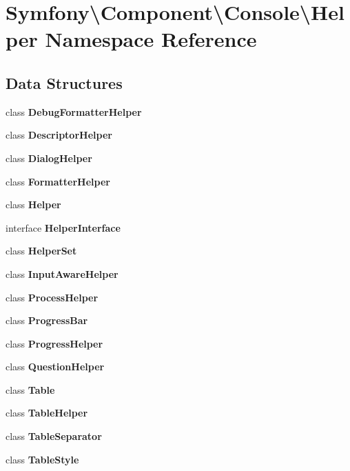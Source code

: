 \section{Symfony\textbackslash{}Component\textbackslash{}Console\textbackslash{}Helper Namespace Reference}
\label{namespace_symfony_1_1_component_1_1_console_1_1_helper}
\subsection*{Data Structures}
\begin{DoxyCompactItemize}
\item 
class {\bf Debug\+Formatter\+Helper}
\item 
class {\bf Descriptor\+Helper}
\item 
class {\bf Dialog\+Helper}
\item 
class {\bf Formatter\+Helper}
\item 
class {\bf Helper}
\item 
interface {\bf Helper\+Interface}
\item 
class {\bf Helper\+Set}
\item 
class {\bf Input\+Aware\+Helper}
\item 
class {\bf Process\+Helper}
\item 
class {\bf Progress\+Bar}
\item 
class {\bf Progress\+Helper}
\item 
class {\bf Question\+Helper}
\item 
class {\bf Table}
\item 
class {\bf Table\+Helper}
\item 
class {\bf Table\+Separator}
\item 
class {\bf Table\+Style}
\end{DoxyCompactItemize}
